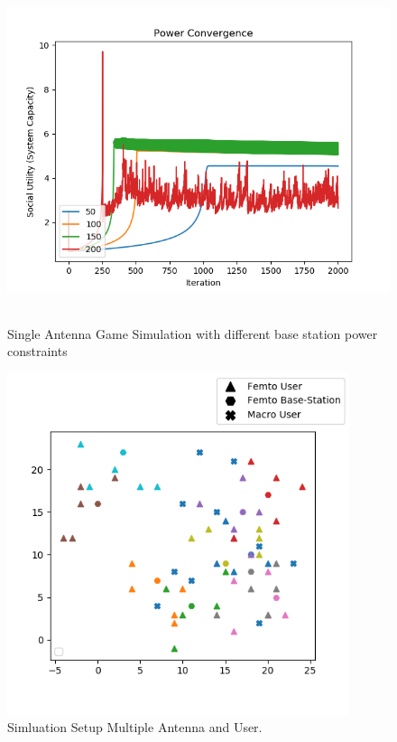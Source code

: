 \documentclass[12pt,a4paper]{report}
\begin{document}
\begin{figure}[H]
	\includegraphics[width=\textwidth,height = 10cm]{figures/single_antenna}
	  \caption{Single Antenna Game Simulation with different base station power constraints}
\end{figure}

\begin{figure}[H]
	\includegraphics[width=\textwidth,height = 10cm]{figures/system_figure_multiple}
	  \caption{Simluation Setup Multiple Antenna and User.
	  }
\end{figure}
\end{document}
